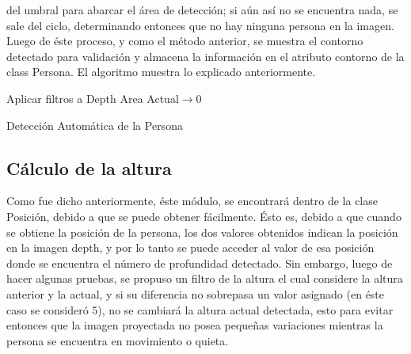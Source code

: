 \documentclass[a4paper,openright,12pt]{report}
\begin{document}
del umbral para abarcar el área de detección; si aún así no se encuentra nada, se sale del ciclo, determinando entonces que no hay ninguna persona en la imagen.\\
Luego de éste proceso, y como el método anterior, se muestra el contorno detectado para validación y almacena la información en el atributo contorno de la class Persona. El algoritmo muestra lo explicado anteriormente.
\begin{algorithm}[tbh]
	\SetAlgoLined
	Aplicar filtros a Depth\;
	Area Actual$\rightarrow$0\;
	\caption{Detección Automática de la Persona}
	\label{alg:deteccAutomatica}
\end{algorithm}
\subsection{Cálculo de la altura}
Como fue dicho anteriormente, éste módulo, se encontrará dentro de la clase Posición, debido a que se puede obtener fácilmente. Ésto es, debido a que cuando se obtiene la posición de la persona, los dos valores obtenidos indican la posición en la imagen depth, y por lo tanto se puede acceder al valor de esa posición donde se encuentra el número de profundidad detectado. Sin embargo, luego de hacer algunas pruebas, se propuso un filtro de la altura el cual considere la altura anterior y la actual, y si su diferencia no sobrepasa un valor asignado (en éste caso se consideró 5), no se cambiará la altura actual detectada, esto para evitar entonces que la imagen proyectada no posea pequeñas variaciones mientras la persona se encuentra en movimiento o quieta.
\end{document}
